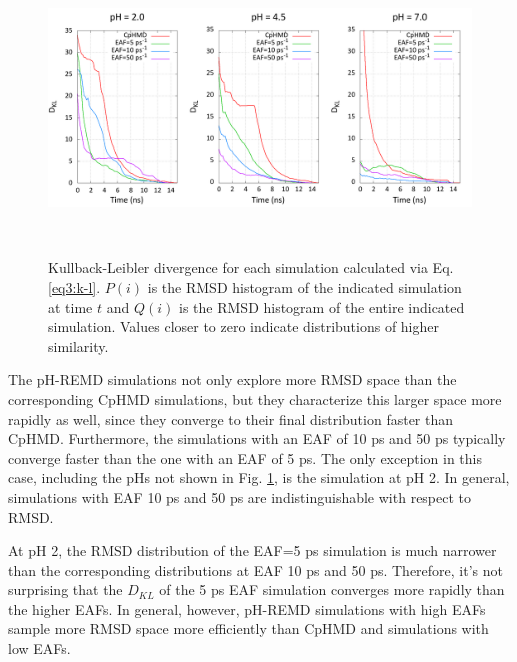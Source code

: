 \begin{figure}
 \includegraphics[width=6.5in, height=3.05in]{Kullback_Leibler.png}
 \caption[Kullback-Leibler divergence for each simulation calculated via Eq.
          \ref{eq3:k-l}.]
         {Kullback-Leibler divergence for each simulation calculated via Eq.
          \ref{eq3:k-l}.  $P(i)$ is the RMSD histogram of the indicated
          simulation at time $t$ and $Q(i)$ is the RMSD histogram of the entire
          indicated simulation.  Values closer to zero indicate distributions of
          higher similarity.}
 \label{fig3:kullback-leibler}
\end{figure}

The pH-REMD simulations not only explore more RMSD space than the corresponding
CpHMD simulations, but they characterize this larger space more rapidly as well,
since they converge to their final distribution faster than CpHMD.  Furthermore,
the simulations with an EAF of 10 ps and 50 ps typically
converge faster than the one with an EAF of 5 ps.  The only exception
in this case, including the pHs not shown in Fig. \ref{fig3:kullback-leibler},
is the simulation at pH 2.  In general, simulations with EAF 10 ps and
50 ps are indistinguishable with respect to RMSD.

At pH 2, the RMSD distribution of the EAF=5 ps simulation is much
narrower than the corresponding distributions at EAF 10 ps and 50
ps.  Therefore, it's not surprising that the $D_{KL}$ of the 5
ps EAF simulation converges more rapidly than the higher EAFs.  In
general, however, pH-REMD simulations with high EAFs sample more RMSD space more
efficiently than CpHMD and simulations with low EAFs.

